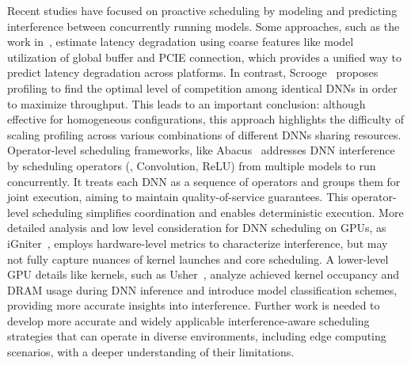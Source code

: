 Recent studies have focused on proactive scheduling by modeling and predicting interference between concurrently running models. 
Some approaches, such as the work in~\cite{mendoza2021interference}, estimate latency degradation using coarse features like model utilization of global buffer and PCIE connection, which provides a unified way to predict latency degradation across platforms. 
In contrast, Scrooge~\cite{hu2021scrooge} proposes profiling to find the optimal level of competition among identical DNNs in order to maximize throughput. This leads to an important conclusion: although effective for homogeneous configurations, this approach highlights the difficulty of scaling profiling across various combinations of different DNNs sharing resources.
Operator-level scheduling frameworks, like Abacus~\cite{cui2021Abacus} addresses DNN interference by scheduling operators (\eg, Convolution, ReLU) from multiple models to run concurrently. It treats each DNN as a sequence of operators and groups them for joint execution, aiming to maintain quality-of-service guarantees. This operator-level scheduling simplifies coordination and enables deterministic execution.
More detailed analysis and low level consideration for DNN scheduling on GPUs, as iGniter~\cite{xu2022igniter}, employs hardware-level metrics to characterize interference, but may not fully capture nuances of kernel launches and core scheduling.
A lower-level GPU details like kernels, such as Usher~\cite{shubha2024usher}, analyze achieved kernel occupancy and DRAM usage during DNN inference and introduce model classification schemes, providing more accurate insights into interference.
Further work is needed to develop more accurate and widely applicable interference-aware scheduling strategies that can operate in diverse environments, including edge computing scenarios, with a deeper understanding of their limitations.